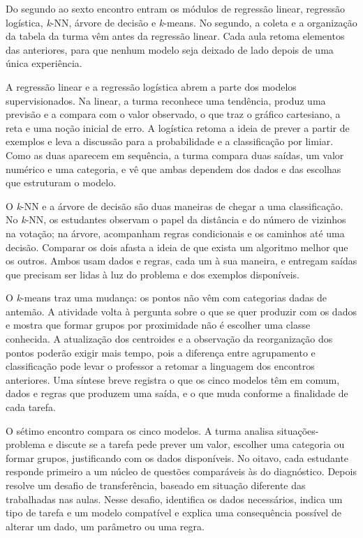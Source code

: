 Do segundo ao sexto encontro entram os módulos de regressão linear, regressão logística, \textit{k}-NN, árvore de decisão e \textit{k}-means. No segundo, a coleta e a organização da tabela da turma vêm antes da regressão linear. Cada aula retoma elementos das anteriores, para que nenhum modelo seja deixado de lado depois de uma única experiência.

A regressão linear e a regressão logística abrem a parte dos modelos supervisionados. Na linear, a turma reconhece uma tendência, produz uma previsão e a compara com o valor observado, o que traz o gráfico cartesiano, a reta e uma noção inicial de erro. A logística retoma a ideia de prever a partir de exemplos e leva a discussão para a probabilidade e a classificação por limiar. Como as duas aparecem em sequência, a turma compara duas saídas, um valor numérico e uma categoria, e vê que ambas dependem dos dados e das escolhas que estruturam o modelo.

O \textit{k}-NN e a árvore de decisão são duas maneiras de chegar a uma classificação. No \textit{k}-NN, os estudantes observam o papel da distância e do número de vizinhos na votação; na árvore, acompanham regras condicionais e os caminhos até uma decisão. Comparar os dois afasta a ideia de que exista um algoritmo melhor que os outros. Ambos usam dados e regras, cada um à sua maneira, e entregam saídas que precisam ser lidas à luz do problema e dos exemplos disponíveis.

O \textit{k}-means traz uma mudança: os pontos não vêm com categorias dadas de antemão. A atividade volta à pergunta sobre o que se quer produzir com os dados e mostra que formar grupos por proximidade não é escolher uma classe conhecida. A atualização dos centroides e a observação da reorganização dos pontos poderão exigir mais tempo, pois a diferença entre agrupamento e classificação pode levar o professor a retomar a linguagem dos encontros anteriores. Uma síntese breve registra o que os cinco modelos têm em comum, dados e regras que produzem uma saída, e o que muda conforme a finalidade de cada tarefa.

O sétimo encontro compara os cinco modelos. A turma analisa situações-problema e discute se a tarefa pede prever um valor, escolher uma categoria ou formar grupos, justificando com os dados disponíveis. No oitavo, cada estudante responde primeiro a um núcleo de questões comparáveis às do diagnóstico. Depois resolve um desafio de transferência, baseado em situação diferente das trabalhadas nas aulas. Nesse desafio, identifica os dados necessários, indica um tipo de tarefa e um modelo compatível e explica uma consequência possível de alterar um dado, um parâmetro ou uma regra.

